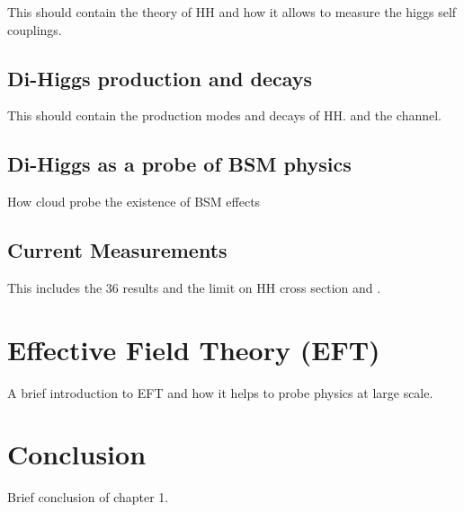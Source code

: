 This should contain the theory of HH and how it allows to measure the higgs self couplings.

\subsection{Di-Higgs production and decays}
\label{chap1:HH:HPD}

This should contain the production modes and decays of HH. and the \HHyybb channel.

\subsection{Di-Higgs as a probe of BSM physics}
\label{chap1:HH:BSM}
How \kl cloud probe the existence of BSM effects

\subsection{Current Measurements}
\label{chap1:HH:CM}
This includes the 36 \ifb results and the limit on HH cross section and \kl.

\section{Effective Field Theory (EFT)}
\label{chap1:EFT}

A brief introduction to EFT and how it helps to probe physics at large scale.\\

\section{Conclusion}
\label{chap1:Conc}

Brief conclusion of chapter 1.




